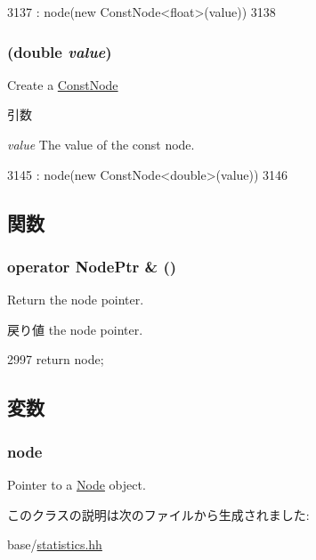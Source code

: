 \begin{DoxyCode}
3137         : node(new ConstNode<float>(value))
3138     { }
\end{DoxyCode}
\hypertarget{classStats_1_1Temp_a7a15a2cd2ec08bb72204b15f13c41c58}{
\subsubsection[{Temp}]{ (double {\em value})}}
\label{classStats_1_1Temp_a7a15a2cd2ec08bb72204b15f13c41c58}
Create a \hyperlink{classStats_1_1ConstNode}{ConstNode} 
\begin{DoxyParams}{引数}
\item[{\em value}]The value of the const node. \end{DoxyParams}



\begin{DoxyCode}
3145         : node(new ConstNode<double>(value))
3146     { }
\end{DoxyCode}


\subsection{関数}
\hypertarget{classStats_1_1Temp_aac20cb971fa60a5cfd36d3f8c32290cb}{
\subsubsection[{operator NodePtr \&}]{\setlength{\rightskip}{0pt plus 5cm}operator {\bf NodePtr} \& ()}}
\label{classStats_1_1Temp_aac20cb971fa60a5cfd36d3f8c32290cb}
Return the node pointer. \begin{DoxyReturn}{戻り値}
the node pointer. 
\end{DoxyReturn}



\begin{DoxyCode}
2997 { return node; }
\end{DoxyCode}


\subsection{変数}
\hypertarget{classStats_1_1Temp_af543614539e0077318342ca740f88513}{
\subsubsection[{node}]{ {\bf node}}}
\label{classStats_1_1Temp_af543614539e0077318342ca740f88513}
Pointer to a \hyperlink{classStats_1_1Node}{Node} object. 

このクラスの説明は次のファイルから生成されました:\begin{DoxyCompactItemize}
\item 
base/\hyperlink{statistics_8hh}{statistics.hh}\end{DoxyCompactItemize}
